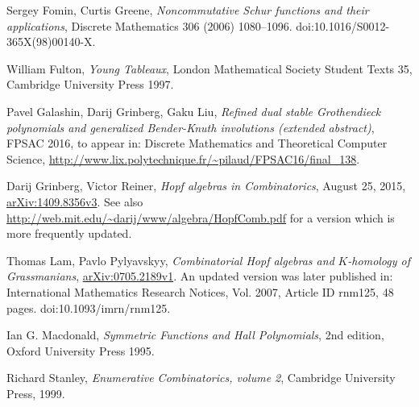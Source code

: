 \documentclass[numbers=enddot,12pt,final,onecolumn,notitlepage]{scrartcl}%
\theoremstyle{definition}
\begin{document}
\begin{thebibliography}{99999999}                                                                                         %


%

Sergey Fomin, Curtis Greene, \textit{Noncommutative
Schur functions and their applications}, Discrete Mathematics 306 (2006) 1080--1096.
doi:10.1016/S0012-365X(98)00140-X.

William Fulton, \textit{Young Tableaux}, London
Mathematical Society Student Texts 35, Cambridge University Press 1997.

Pavel Galashin, Darij Grinberg, Gaku Liu,
\textit{Refined dual stable Grothendieck polynomials
and generalized Bender-Knuth involutions (extended abstract)},
FPSAC 2016, to appear in:
Discrete Mathematics and Theoretical Computer Science,
\url{http://www.lix.polytechnique.fr/~pilaud/FPSAC16/final_138}.

Darij Grinberg, Victor Reiner, \textit{Hopf
algebras in Combinatorics}, August 25, 2015,
\href{http://arxiv.org/abs/1409.8356v3}{arXiv:1409.8356v3}. \newline See also
\url{http://web.mit.edu/~darij/www/algebra/HopfComb.pdf} for a version which
is more frequently updated.

Thomas Lam, Pavlo Pylyavskyy, \textit{Combinatorial
Hopf algebras and }$K$\textit{-homology of Grassmanians},
\href{http://arxiv.org/abs/0705.2189v1}{arXiv:0705.2189v1}. An updated version
was later published in: International Mathematics Research Notices, Vol. 2007,
Article ID rnm125, 48 pages. doi:10.1093/imrn/rnm125.

Ian G. Macdonald, \textit{Symmetric Functions and
Hall Polynomials}, 2nd edition, Oxford University Press 1995.

Richard Stanley, \textit{Enumerative Combinatorics,
volume 2}, Cambridge University Press, 1999.
\end{thebibliography}
\end{document}
